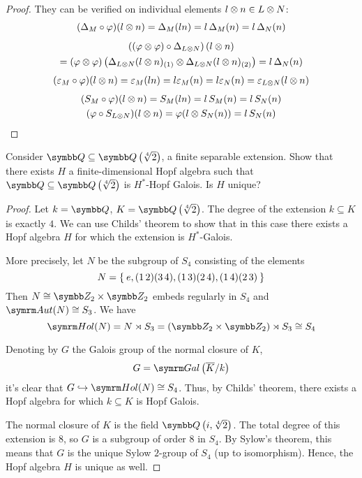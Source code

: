\begin{proof}
They can be verified on individual elements \(l \otimes n \in L \otimes N\):
\begin{gather*}
    (\Delta_M \circ \varphi) (l \otimes n) = \Delta_M (ln) = l \, \Delta_M (n) = l \, \Delta_N (n) \\[0.5em]
    \left((\varphi \otimes \varphi) \circ \Delta_{L \otimes N}\right) (l \otimes n) \\
    = (\varphi \otimes \varphi) \left(\Delta_{L \otimes N} (l \otimes n)_{(1)} \otimes \Delta_{L \otimes N} (l \otimes n)_{(2)}\right) = l \, \Delta_N (n)
\end{gather*}
\begin{gather*}
    (\varepsilon_M \circ \varphi)(l \otimes n) = \varepsilon_M (ln) = l \varepsilon_M (n) = l \varepsilon_N (n) = \varepsilon_{L \otimes N} (l \otimes n)    
\end{gather*}
\begin{gather*}
    (S_M \circ \varphi)(l \otimes n) = S_M (l n) = l \, S_M (n) = l \, S_N (n) \\
    (\varphi \circ S_{L \otimes N}) (l \otimes n) = \varphi (l \otimes S_N (n)) = l \, S_N (n)
\end{gather*}
\end{proof}

\begin{exercise}
Consider \(\rationals \subseteq \adjoin{\sqrt[4]{2}}\), a finite separable extension. Show that there exists \(H\) a finite-dimensional Hopf algebra such that \(\rationals \subseteq \adjoin{\sqrt[4]{2}}\) is \(H^*\)-Hopf Galois. Is \(H\) unique?
\end{exercise}
\begin{proof}
Let \(k = \rationals\), \(K = \adjoin{\sqrt[4]{2}}\). The degree of the extension \(k \subseteq K\) is exactly \(4\). We can use Childs' theorem to show that in this case there exists a Hopf algebra \(H\) for which the extension is \(H^*\)-Galois.

More precisely, let \(N\) be the subgroup of \(S_4\) consisting of the elements
\[
    N = \Set{ e, (1 \, 2) (3 \, 4), (1 \, 3) (2 \, 4), (1 \, 4) (2 \, 3) }
\]
Then \(N \cong \integersmod{2} \times \integersmod{2}\) embeds regularly in \(S_4\) and \(\Aut(N) \cong S_3\). We have
\[
    \Hol(N) = N \rtimes S_3 = \left(\integersmod{2} \times \integersmod{2}\right) \rtimes S_3 \cong S_4
\]

Denoting by \(G\) the Galois group of the normal closure of \(K\),
\[
    G = \Gal{\overline{K}}{k}
\]
it's clear that \(G \hookrightarrow \Hol(N) \cong S_4\). Thus, by Childs' theorem, there exists a Hopf algebra for which \(k \subseteq K\) is Hopf Galois.

The normal closure of \(K\) is the field \(\adjoin{i, \sqrt[4]{2}}\). The total degree of this extension is \(8\), so \(G\) is a subgroup of order \(8\) in \(S_4\). By Sylow's theorem, this means that \(G\) is the unique Sylow \(2\)-group of \(S_4\) (up to isomorphism). Hence, the Hopf algebra \(H\) is unique as well.
\end{proof}

